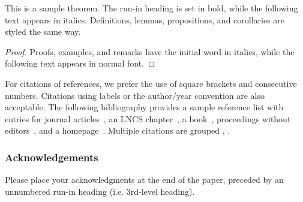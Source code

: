 \documentclass[runningheads]{llncs}
\begin{document}
\begin{theorem}
This is a sample theorem. The run-in heading is set in bold, while
the following text appears in italics. Definitions, lemmas,
propositions, and corollaries are styled the same way.
\end{theorem}
%
%
\begin{proof}
Proofs, examples, and remarks have the initial word in italics,
while the following text appears in normal font.
\end{proof}
For citations of references, we prefer the use of square brackets
and consecutive numbers. Citations using labels or the author/year
convention are also acceptable. The following bibliography provides
a sample reference list with entries for journal
articles~\cite{ref_article1}, an LNCS chapter~\cite{ref_lncs1}, a
book~\cite{ref_book1}, proceedings without editors~\cite{ref_proc1},
and a homepage~\cite{ref_url1}. Multiple citations are grouped
\cite{ref_article1,ref_lncs1,ref_book1},
\cite{ref_article1,ref_book1,ref_proc1,ref_url1}.

\subsubsection{Acknowledgements} Please place your acknowledgments at
the end of the paper, preceded by an unnumbered run-in heading (i.e.
3rd-level heading).
\end{document}
